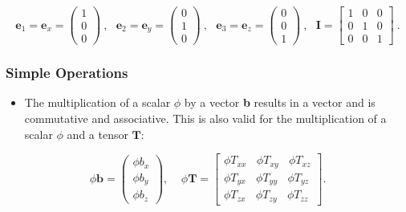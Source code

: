 \begin{equation*}
\textbf{e}_1 = \textbf{e}_x = \left( \begin{matrix}   1 \\ 0 \\ 0  \end{matrix}  \right)
~,~~~
\textbf{e}_2= \textbf{e}_y = \left( \begin{matrix}   0 \\ 1 \\ 0  \end{matrix}  \right)
~,~~~
\textbf{e}_3= \textbf{e}_z = \left( \begin{matrix}   0 \\ 0 \\ 1  \end{matrix}  \right)
~,~~~
\textbf{I} = \left[ \begin{matrix}   1 & 0 & 0 \\ 0 & 1 & 0 \\ 0 & 0 & 1  \end{matrix}  \right] ~.
\end{equation*}
%
%
%
\subsubsection{Simple Operations}
%
%
\begin{itemize}
    \item The multiplication of a scalar $\phi$ by a vector \textbf{b} results
    in a vector and is commutative and associative. This is also valid for
    the multiplication of a scalar $\phi$ and a tensor $\textbf{T}$:
\end{itemize}
%
%
\begin{equation}
  \phi \textbf{b} =
  \left(
  \begin{matrix}
    \phi b_x \\ \phi b_y \\ \phi b_z
  \end{matrix}
  \right)
  ,~~~~~
  \phi\textbf{T}
=
  \left[
  \begin{matrix}
   \phi T_{xx} ~ ~ ~ ~ \phi T_{xy} ~ ~ ~ ~ \phi T_{xz} \\
   \phi T_{yx} ~ ~ ~ ~ \phi T_{yy} ~ ~ ~ ~ \phi T_{yz} \\
   \phi T_{zx} ~ ~ ~ ~ \phi T_{zy} ~ ~ ~ ~ \phi T_{zz}
  \end{matrix}
  \right].
\label{EQUATION::simple}
\end{equation}
%
%
%
%
